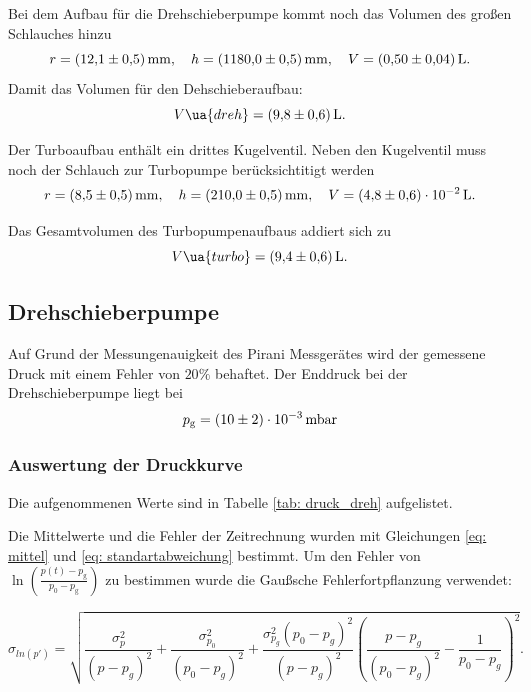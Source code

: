 Bei dem Aufbau für die Drehschieberpumpe kommt noch das Volumen des großen Schlauches hinzu
\begin{equation*}
  r=\SI{12.1\pm 0.5}{\milli\meter}, \quad h=\SI{1180\pm0.5}{\milli\meter}, \quad V=\SI{ 0.5\pm0.04}{\litre}.
\end{equation*}
Damit das Volumen für den Dehschieberaufbau:
\begin{equation}
  \label{eq:volumen_drehschieber}
  V\ua{dreh}=\SI{9.8\pm0.6}{\litre}.
\end{equation}

Der Turboaufbau enthält ein drittes Kugelventil.
Neben den Kugelventil muss noch der Schlauch zur Turbopumpe berücksichtitigt werden
\begin{equation*}
  r=\SI{8.5\pm 0.5}{\milli\meter}, \quad h=\SI{210\pm0.5}{\milli\meter}, \quad V=\SI{ 4.8\pm0.6 e-2}{\litre}.
\end{equation*}

Das Gesamtvolumen des Turbopumpenaufbaus addiert sich zu
\begin{equation}
  \label{eq:volume_turbo}
  V\ua{turbo}=\SI{9.4\pm0.6}{\litre}.
\end{equation}
\subsection{Drehschieberpumpe}
Auf Grund der Messungenauigkeit des Pirani Messgerätes wird der gemessene
Druck mit einem Fehler von $20\%$ behaftet.
Der Enddruck bei der Drehschieberpumpe liegt bei
\begin{equation}
  \label{eq:enddruck_drehschieber}
  p_{\mathrm{g}}=\SI{10 \pm 2 e-3}{\milli\bar}
\end{equation}

\subsubsection{Auswertung der Druckkurve}

Die aufgenommenen Werte sind in Tabelle \ref{tab: druck_dreh} aufgelistet.

Die Mittelwerte und die Fehler der Zeitrechnung wurden mit Gleichungen \eqref{eq: mittel} und
\eqref{eq: standartabweichung} bestimmt. Um den Fehler von $\ln(\frac{ p(t)-p_{ \mathrm{g} } }{ p_0-p_{ \mathrm{g} } })$
zu bestimmen wurde die Gaußsche Fehlerfortpflanzung verwendet:

\begin{equation}
  \label{eq: fehler_ln_druck}
  \sigma_{ln(p')}=\sqrt{\frac{\sigma_{p}^{2}}{\left(p - p_{g}\right)^{2}} + \frac{\sigma_{p_{0}}^{2}}{\left(p_{0} - p_{g}\right)^{2}} + \frac{\sigma_{p_{g}}^{2} \left(p_{0} - p_{g}\right)^{2}}{\left(p - p_{g}\right)^{2}} \left(\frac{p - p_{g}}{\left(p_{0} - p_{g}\right)^{2}} - \frac{1}{p_{0} - p_{g}}\right)^{2}}.
\end{equation}

